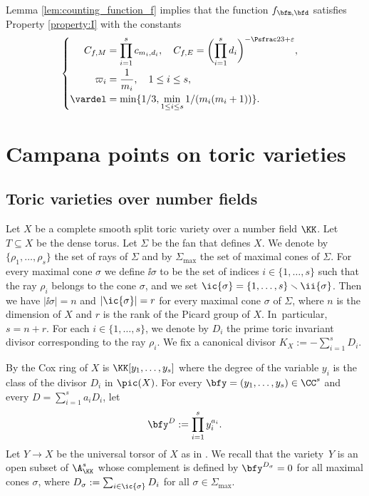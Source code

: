 Lemma \ref{lem:counting_function_f} implies that the function $f_{\bfm, \bfd}$ satisfies Property \ref{property:I} with the constants
\[
\begin{cases}
\begin{aligned}
C_{f,M} &= \prod_{i=1}^s c_{m_i,d_i}, \quad C_{f,E} = \biggl(\prod_{i=1}^sd_i\biggr)^{-\Psfrac23+\varepsilon},\\
\varpi_i&= \frac{1}{m_i}, \quad 1\leq i\leq s,\\
\vardel &= \min \{ 1/3 , \min_{1\leq i\leq s}1/(m_i(m_i+1)) \}.
\end{aligned}
\end{cases}
\]

\section{Campana points on toric varieties}
\label{sec:Campana_points_on_toric_varieties}
\subsection{Toric varieties over number fields}

Let $X$ be a complete smooth split toric variety over a number field $\KK$.
Let $T\subseteq X$ be the dense torus.
Let $\Sigma$ be the fan that defines $X$.
We denote by $\{\rho_1,\dots,\rho_s\}$ the set of rays of $\Sigma$
and by $\Sigma_{\max}$ the set of maximal cones of $\Sigma$.
For every maximal cone $\sigma$ we define $\ii{\sigma}$ to be the set of indices
$i\in\{1,\dots,s\}$ such that the ray $\rho_i$ belongs to the cone $\sigma$,
and we set $\ic{\sigma}=\{1,\dots,s\}\smallsetminus \ii{\sigma}$.
Then we have $|\ii{\sigma}|=n$ and $|\ic{\sigma}|=r$ for every maximal cone $\sigma$ of $\Sigma$,
where $n$ is the dimension of $X$ and $r$ is the rank of the Picard group of $X$.
In~particular, $s=n+r$.
For each $i\in\{1,\dots,s\}$, we denote by $D_i$ the prime toric invariant divisor
corresponding to the ray $\rho_i$. We fix a canonical divisor $K_X:=-\sum_{i=1}^s D_i$.

By \cite{MR1299003} the Cox ring of $X$ is $\KK[y_1,\dots,y_s]$
where the degree of the variable $y_i$ is
the class of the divisor $D_i$ in $\pic(X)$.
For every $\bfy=(y_1,\dots,y_s)\in \CC^{s}$ and every $D=\sum_{i=1}^s a_i D_i$,
let \[
\bfy^D:=\prod_{i=1}^sy_i^{a_i}.
\]
Let $Y\to X$ be the universal torsor of $X$
as in \cite[\S8]{MR1679841}. We recall that the variety~$Y$ is an open subset of
$\A^{s}_{\KK}$ whose complement is defined by $\bfy^{D_\sigma}=0$ for all
maximal cones $\sigma$, where
$
D_\sigma:=\sum_{i\in\ic{\sigma}}D_i
$
for all $\sigma\in\Sigma_{\max}$.

